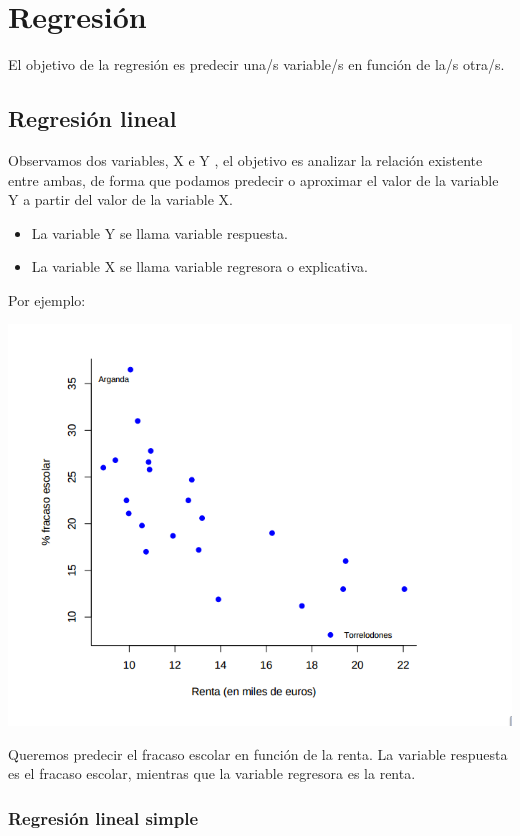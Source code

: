 
\chapter{Regresión}
El objetivo de la regresión es predecir una/s variable/s en función de la/s otra/s.


\section{Regresión lineal}

Observamos dos variables, X e Y , el objetivo es analizar la relación existente entre ambas, de forma que podamos predecir o aproximar el valor de la variable Y a partir del valor de la variable X.

\begin{itemize}
\item La variable Y se llama variable respuesta.
\item La variable X se llama variable regresora o explicativa.
\end{itemize}

Por ejemplo:
\begin{center}
\includegraphics[scale=0.5]{img/RentaVsFracaso.png}
\end{center}

Queremos predecir el fracaso escolar en función de la renta. La variable respuesta es el fracaso escolar, mientras que la variable regresora es la renta.

\subsection{Regresión lineal simple}

